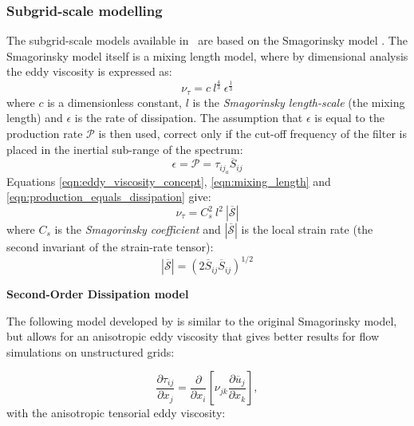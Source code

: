 \subsubsection{Subgrid-scale modelling}
\label{sec:LES_sgs_modelling}
The subgrid-scale models available in \fluidity\ are based on the Smagorinsky model
\citep{smagorinsky1963general}. The Smagorinsky model itself is a mixing length model, where by
dimensional analysis \citep{deardorff1970, germano1992} the eddy viscosity is expressed as:
\begin{equation}
\nu_\tau = c \ l^{\frac{4}{3}} \ \epsilon^{\frac 1 3}
\label{eqn:mixing_length}
\end{equation}
where $c$ is a dimensionless constant, $l$ is the \emph{Smagorinsky length-scale} (the mixing length)
and $\epsilon$ is the rate of dissipation. The assumption that $\epsilon$ is equal to the production
rate $\mathcal{P}$ is then used, correct only if the cut-off frequency of the filter is placed in the
inertial sub-range of the spectrum:
\begin{equation}
\epsilon = \mathcal{P} = \tau_{{ij}_a} \overline{S}_{ij}
\label{eqn:production_equals_dissipation}
\end{equation}
Equations \eqref{eqn:eddy_viscosity_concept}, \eqref{eqn:mixing_length} and
\eqref{eqn:production_equals_dissipation} give: 
\begin{equation}
\nu_\tau = C_s^2 \ l^2 \ \left| \mathcal{\overline{S}} \right| 
\end{equation}
where $C_s$ is the \emph{Smagorinsky coefficient} and $\left | \mathcal{\overline{S}} \right |$ is the local strain
rate (the second invariant of the strain-rate tensor):
\begin{equation}
\left| \mathcal{\overline{S}} \right| = \left( 2 \overline{S}_{ij} \overline{S}_{ij} \right)^{1/2}
\end{equation}

\par{\textbf{Second-Order Dissipation model}\\}
\label{sec:second_order_diss_LES}

The following model developed by \citet{bentham2003} is similar to the original Smagorinsky model, but allows for an anisotropic eddy viscosity that gives better results for flow simulations on unstructured grids:

\begin{equation}
\frac{\partial \tau_{ij}}{\partial x_j} = \frac{\partial}{\partial x_i} \left [ \nu_{jk}\frac{\partial \overline{u}_j}{\partial x_k} \right ],
\end{equation}
with the anisotropic tensorial eddy viscosity:

